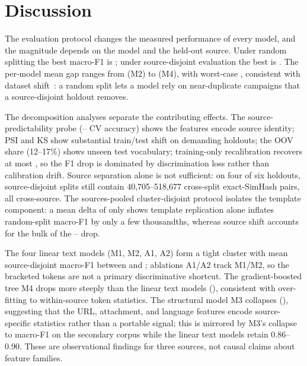 \documentclass[conference]{IEEEtran}
\begin{document}
\section{Discussion}
The evaluation protocol changes the measured performance of every model, and the magnitude depends on the model and the held-out source. Under random splitting the best macro-F1 is \RandomBestMacroFOne{}; under source-disjoint evaluation the best is \SourceBestMacroFOne{}. The per-model mean gap ranges from \GapMeanMTwo{} (M2) to \GapMeanMFour{} (M4), with worst-case \GapWorstMFour{}, consistent with dataset shift~\cite{dataset_shift}: a random split lets a model rely on near-duplicate campaigns that a source-disjoint holdout removes.

The decomposition analyses separate the contributing effects. The source-predictability probe (\SourcePredMin{}--\SourcePredMax{} CV accuracy) shows the features encode source identity; PSI and KS show substantial train/test shift on demanding holdouts; the OOV share (12--17\%) shows unseen test vocabulary; training-only recalibration recovers at most \RecalMaxGain{}, so the F1 drop is dominated by discrimination loss rather than calibration drift. Source separation alone is not sufficient: on four of six holdouts, source-disjoint splits still contain 40,705--518,677 cross-split exact-SimHash pairs, all cross-source. The sources-pooled cluster-disjoint protocol isolates the template component: a mean delta of only \PooledClusterGapMean{} shows template replication alone inflates random-split macro-F1 by only a few thousandths, whereas source shift accounts for the bulk of the \GapMeanMTwo{}--\GapMeanMFour{} drop.

The four linear text models (M1, M2, A1, A2) form a tight cluster with mean source-disjoint macro-F1 between \SourceMeanMacroFOneMOne{} and \SourceMeanMacroFOneATwo{}; ablations A1/A2 track M1/M2, so the bracketed tokens are not a primary discriminative shortcut. The gradient-boosted tree M4 drops more steeply than the linear text models (\SourceMeanMacroFOneMFour{}), consistent with over-fitting to within-source token statistics. The structural model M3 collapses (\SourceMeanMacroFOneMThree{}), suggesting that the URL, attachment, and language features encode source-specific statistics rather than a portable signal; this is mirrored by M3's collapse to macro-F1 \SecFMThree{} on the secondary corpus while the linear text models retain 0.86--0.90. These are observational findings for three sources, not causal claims about feature families.
\end{document}
